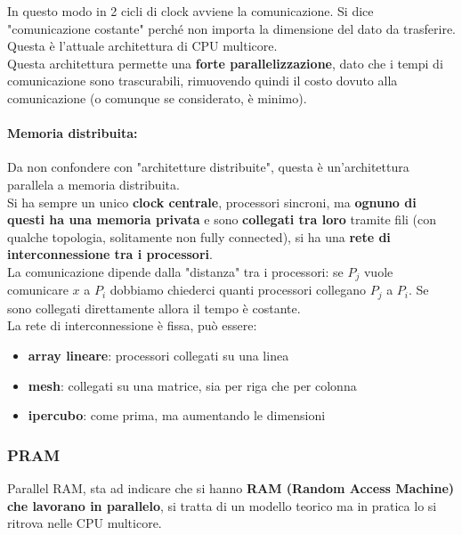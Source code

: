 \documentclass[11pt]{article}
\begin{document}
	In questo modo in 2 cicli di clock avviene la comunicazione. Si dice "comunicazione costante" perché non importa la dimensione del dato da trasferire. Questa è l'attuale architettura di CPU multicore. \\
	
	Questa architettura permette una \textbf{forte parallelizzazione}, dato che i tempi di comunicazione sono trascurabili, rimuovendo quindi il costo dovuto alla comunicazione (o comunque se considerato, è minimo).\\
	
	\paragraph{Memoria distribuita:} Da non confondere con "architetture distribuite", questa è un'architettura parallela a memoria distribuita.\\
	Si ha sempre un unico \textbf{clock centrale}, processori sincroni, ma \textbf{ognuno di questi ha una memoria privata} e sono \textbf{collegati tra loro} tramite fili (con qualche topologia, solitamente non fully connected), si ha una \textbf{rete di interconnessione tra i processori}.\\
	
	La comunicazione dipende dalla "distanza" tra i processori: se $P_j$ vuole comunicare $x$ a $P_i$ dobbiamo chiederci quanti processori collegano $P_j$ a $P_i$. Se sono collegati direttamente allora il tempo è costante.\\
	
	La rete di interconnessione è fissa, può essere: 
	\begin{itemize}
		\item \textbf{array lineare}: processori collegati su una linea
		\item \textbf{mesh}: collegati su una matrice, sia per riga che per colonna
		\item \textbf{ipercubo}: come prima, ma aumentando le dimensioni
	\end{itemize}
	
	\newpage
	
	\subsubsection{PRAM}
	Parallel RAM, sta ad indicare che si hanno \textbf{RAM (Random Access Machine) che lavorano in parallelo}, si tratta di un modello teorico ma in pratica lo si ritrova nelle CPU multicore.\\
	
\end{document}
